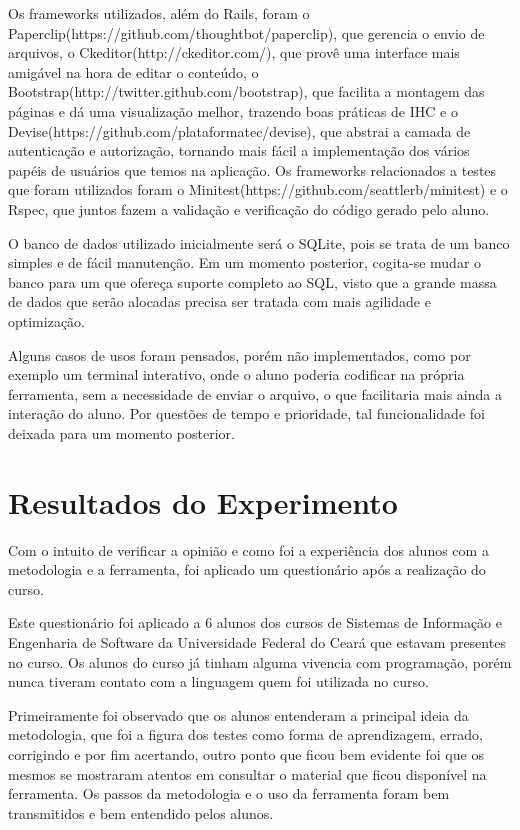 \documentclass[pnumabnt,normaltoc,espacoumemeio,capchap]{abnt}
\begin{document}
\par Os frameworks utilizados, além do Rails, foram o Paperclip(https://github.com/thoughtbot/paperclip), que gerencia o envio de arquivos, o Ckeditor(http://ckeditor.com/), que provê uma interface mais amigável na hora de editar o conteúdo, o Bootstrap(http://twitter.github.com/bootstrap), que facilita a montagem das páginas e dá uma visualização melhor, trazendo boas práticas de IHC e o Devise(https://github.com/plataformatec/devise), que abstrai a camada de autenticação e autorização, tornando mais fácil a implementação dos vários papéis de usuários que temos na aplicação. Os frameworks relacionados a testes que foram utilizados foram o Minitest(https://github.com/seattlerb/minitest) e o Rspec, que juntos fazem a validação e verificação do código gerado pelo aluno.
\par O banco de dados utilizado inicialmente será o SQLite, pois se trata de um banco simples e de fácil manutenção. Em um momento posterior, cogita-se mudar o banco para um que ofereça suporte completo ao SQL, visto que a grande massa de dados que serão alocadas precisa ser tratada com mais agilidade e optimização.
\par Alguns casos de usos foram pensados, porém não implementados, como por exemplo um terminal interativo, onde o aluno poderia codificar na própria ferramenta, sem a necessidade de enviar o arquivo, o que facilitaria mais ainda a interação do aluno. Por questões de tempo e prioridade, tal funcionalidade foi deixada para um momento posterior.

\chapter{Resultados do Experimento}
\par Com o intuito de verificar a opinião e como foi a experiência dos alunos com a metodologia e a ferramenta, foi aplicado um questionário após a realização do curso.

\par Este questionário foi aplicado a 6 alunos dos cursos de Sistemas de Informação e Engenharia de Software da Universidade Federal do Ceará que estavam presentes no curso. Os alunos do curso já tinham alguma vivencia com programação, porém nunca tiveram contato com a linguagem quem foi utilizada no curso.

\par Primeiramente foi observado que os alunos entenderam a principal ideia da metodologia, que foi a figura dos testes como forma de aprendizagem, errado, corrigindo e por fim acertando, outro ponto que ficou bem evidente foi que os mesmos se mostraram atentos em consultar o material que ficou disponível na ferramenta. Os passos da metodologia e o uso da ferramenta foram bem transmitidos e bem entendido pelos alunos.
\end{document}
